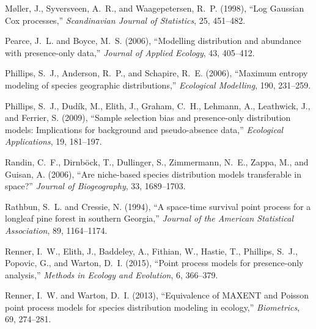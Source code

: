 \documentclass[11pt, titlepage]{article}
\begin{document}
\begin{spacing}{1.9}
\begin{flushleft}
\begin{thebibliography}{59}
Møller, J., Syversveen, A.~R., and Waagepetersen, R.~P. (1998), \enquote{Log
  {Gaussian} {Cox} processes,} \textit{Scandinavian Journal of Statistics}, 25,
  451--482.

Pearce, J.~L. and Boyce, M.~S. (2006), \enquote{Modelling distribution and
  abundance with presence-only data,} \textit{Journal of Applied Ecology}, 43,
  405--412.

Phillips, S.~J., Anderson, R.~P., and Schapire, R.~E. (2006), \enquote{Maximum
  entropy modeling of species geographic distributions,} \textit{Ecological
  Modelling}, 190, 231--259.

Phillips, S.~J., Dudík, M., Elith, J., Graham, C.~H., Lehmann, A., Leathwick,
  J., and Ferrier, S. (2009), \enquote{Sample selection bias and presence-only
  distribution models: {Implications} for background and pseudo-absence data,}
  \textit{Ecological Applications}, 19, 181--197.

Randin, C.~F., Dirnböck, T., Dullinger, S., Zimmermann, N.~E., Zappa, M., and
  Guisan, A. (2006), \enquote{Are niche-based species distribution models
  transferable in space?} \textit{Journal of Biogeography}, 33, 1689--1703.

Rathbun, S.~L. and Cressie, N. (1994), \enquote{A space-time survival point
  process for a longleaf pine forest in southern {Georgia},} \textit{Journal of
  the American Statistical Association}, 89, 1164--1174.

Renner, I.~W., Elith, J., Baddeley, A., Fithian, W., Hastie, T., Phillips,
  S.~J., Popovic, G., and Warton, D.~I. (2015), \enquote{Point process models
  for presence-only analysis,} \textit{Methods in Ecology and Evolution}, 6,
  366--379.

Renner, I.~W. and Warton, D.~I. (2013), \enquote{Equivalence of {MAXENT} and
  {Poisson} point process models for species distribution modeling in ecology,}
  \textit{Biometrics}, 69, 274--281.


\end{thebibliography}
\end{flushleft}
\end{spacing}
\end{document}

